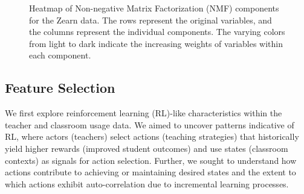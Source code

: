 \documentclass[
  number,
  preprint,
  3p,
  onecolumn]{elsarticle}
\begin{document}
\begin{figure}

\begin{minipage}{\linewidth}



\end{minipage}%
\newline
\begin{minipage}{\linewidth}



\end{minipage}%

\caption{\label{fig-nmf-heatmap}Heatmap of Non-negative Matrix
Factorization (NMF) components for the Zearn data. The rows represent
the original variables, and the columns represent the individual
components. The varying colors from light to dark indicate the
increasing weights of variables within each component.}

\end{figure}%

\subsection{Feature Selection}\label{feature-selection-1}

We first explore reinforcement learning (RL)-like characteristics within
the teacher and classroom usage data. We aimed to uncover patterns
indicative of RL, where actors (teachers) select actions (teaching
strategies) that historically yield higher rewards (improved student
outcomes) and use states (classroom contexts) as signals for action
selection. Further, we sought to understand how actions contribute to
achieving or maintaining desired states and the extent to which actions
exhibit auto-correlation due to incremental learning processes.
\end{document}
